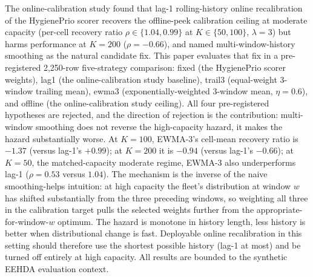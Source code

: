 The online-calibration study found that lag-1 rolling-history online recalibration of the
HygienePrio scorer recovers the offline-peek calibration ceiling at
moderate capacity (per-cell recovery ratio $\rho \in \{1.04, 0.99\}$
at $K \in \{50, 100\}$, $\lambda = 3$) but harms performance at
$K = 200$ ($\rho = -0.66$), and named multi-window-history smoothing
as the natural candidate fix. This paper evaluates that fix in a
pre-registered 2{,}250-row five-strategy comparison: fixed (the HygienePrio scorer
weights), lag1 (the online-calibration study baseline), trail3 (equal-weight 3-window
trailing mean), ewma3 (exponentially-weighted 3-window mean,
$\eta = 0.6$), and offline (the online-calibration study ceiling). All four pre-registered
hypotheses are rejected, and the direction of rejection is the
contribution: multi-window smoothing does not reverse the
high-capacity hazard, it makes the hazard substantially worse. At
$K = 100$, EWMA-3's cell-mean recovery ratio is $-1.37$ (versus
lag-1's $+0.99$); at $K = 200$ it is $-0.94$ (versus lag-1's
$-0.66$); at $K = 50$, the matched-capacity moderate regime, EWMA-3
also underperforms lag-1 ($\rho = 0.53$ versus $1.04$). The mechanism
is the inverse of the naive smoothing-helps intuition: at high
capacity the fleet's distribution at window $w$ has shifted
substantially from the three preceding windows, so weighting all
three in the calibration target pulls the selected weights further
from the appropriate-for-window-$w$ optimum. The hazard is monotone
in history length, less history is better when distributional
change is fast. Deployable online recalibration in this setting
should therefore use the shortest possible history (lag-1 at most)
and be turned off entirely at high capacity. All results are bounded
to the synthetic EEHDA evaluation context.
